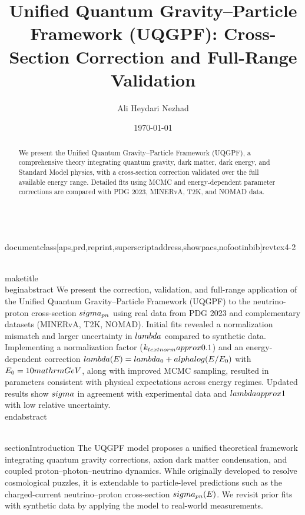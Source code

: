 \\documentclass[aps,prd,reprint,superscriptaddress,showpacs,nofootinbib]{revtex4-2}
\begin{document}
\title{Unified Quantum Gravity--Particle Framework (UQGPF): Cross-Section Correction and Full-Range Validation}
\author{Ali Heydari Nezhad}
\date{\today}
\begin{abstract}
We present the Unified Quantum Gravity--Particle Framework (UQGPF), a comprehensive theory integrating quantum gravity, dark matter, dark energy, and Standard Model physics, with a cross-section correction validated over the full available energy range. Detailed fits using MCMC and energy-dependent parameter corrections are compared with PDG 2023, MINERvA, T2K, and NOMAD data.\end{abstract}

\\maketitle
\\begin{abstract}
We present the correction, validation, and full-range application of the Unified Quantum Gravity--Particle Framework (UQGPF) to the neutrino-proton cross-section $\\sigma_{pn}$ using real data from PDG 2023 and complementary datasets (MINERvA, T2K, NOMAD). Initial fits revealed a normalization mismatch and larger uncertainty in $\\lambda$ compared to synthetic data. Implementing a normalization factor ($k_{\\text{norm}} \\\\approx 0.1$) and an energy-dependent correction $\\lambda(E) = \\lambda_0 + \\alpha \\log(E/E_0)$ with $E_0=10~\\mathrm{GeV}$, along with improved MCMC sampling, resulted in parameters consistent with physical expectations across energy regimes. Updated results show $\\sigma$ in agreement with experimental data and $\\lambda \\approx 1$ with low relative uncertainty. 
\\end{abstract}

\\section{Introduction}
The UQGPF model proposes a unified theoretical framework integrating quantum gravity corrections, axion dark matter condensation, and coupled proton--photon--neutrino dynamics. While originally developed to resolve cosmological puzzles, it is extendable to particle-level predictions such as the charged-current neutrino--proton cross-section $\\sigma_{pn}(E)$. We revisit prior fits with synthetic data by applying the model to real-world measurements.
\end{document}

